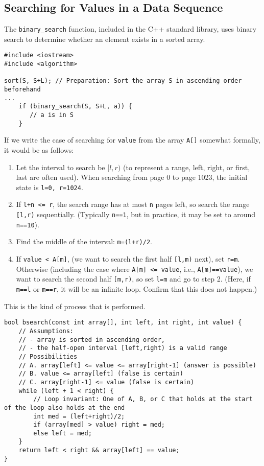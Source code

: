 \subsection{Searching for Values in a Data Sequence}

The \texttt{binary\_search} function, included in the C++ standard library, uses binary search to determine whether an element exists in a sorted array.

\begin{cbox}[emph={sort,binary\_search}]
\begin{verbatim}
#include <iostream>
#include <algorithm>

sort(S, S+L); // Preparation: Sort the array S in ascending order beforehand
...
    if (binary_search(S, S+L, a)) {
       // a is in S
    }
\end{verbatim}
\end{cbox}

If we write the case of searching for \texttt{value} from the array \texttt{A[]} somewhat formally, it would be as follows:
\begin{enumerate}
\setlength{\itemsep}{0pt}
\item Let the interval to search be $[l, r)$ (to represent a range, left, right, or first, last are often used). When searching from page 0 to page 1023, the initial state is \texttt{l=0, r=1024}.
\item If \texttt{l+n <= r}, the search range has at most \texttt{n} pages left, so search the range \texttt{[l,r)} sequentially. (Typically \texttt{n==1}, but in practice, it may be set to around \texttt{n==10}).
\item Find the middle of the interval: \texttt{m=(l+r)/2}.
\item If \texttt{value < A[m]}, (we want to search the first half \texttt{[l,m)} next), set \texttt{r=m}. Otherwise (including the case where \texttt{A[m] <= value}, i.e., \texttt{A[m]==value}), we want to search the second half \texttt{[m,r)}, so set \texttt{l=m} and go to step 2. (Here, if \texttt{m==l} or \texttt{m==r}, it will be an infinite loop. Confirm that this does not happen.)
\end{enumerate}
This is the kind of process that is performed.

\begin{cbox}[emph={left,right}]
\begin{verbatim}
bool bsearch(const int array[], int left, int right, int value) {
    // Assumptions:
    // - array is sorted in ascending order,
    // - the half-open interval [left,right) is a valid range
    // Possibilities
    // A. array[left] <= value <= array[right-1] (answer is possible)
    // B. value <= array[left] (false is certain)
    // C. array[right-1] <= value (false is certain)
    while (left + 1 < right) {
        // Loop invariant: One of A, B, or C that holds at the start of the loop also holds at the end
        int med = (left+right)/2;
        if (array[med] > value) right = med;
        else left = med;
    }
    return left < right && array[left] == value;
}
\end{verbatim}
\end{cbox}

